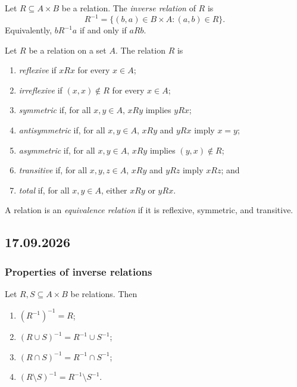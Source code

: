 \documentclass[11pt,a4paper]{amsart}
\begin{document}
\begin{definition}
  Let \(R \subseteq A \times B\) be a relation. The \emph{inverse relation}
  of \(R\) is
  \[
    R^{-1} = \{(b,a) \in B \times A : (a,b) \in R\}.
  \]
  Equivalently, \(bR^{-1}a\) if and only if \(aRb\).
\end{definition}

\begin{definition}
  Let \(R\) be a relation on a set \(A\). The relation \(R\) is
  \begin{enumerate}
    \item \emph{reflexive} if \(xRx\) for every \(x \in A\);
    \item \emph{irreflexive} if \((x,x) \notin R\) for every \(x \in A\);
    \item \emph{symmetric} if, for all \(x,y \in A\),
      \(xRy\) implies \(yRx\);
    \item \emph{antisymmetric} if, for all \(x,y \in A\),
      \(xRy\) and \(yRx\) imply \(x=y\);
    \item \emph{asymmetric} if, for all \(x,y \in A\),
      \(xRy\) implies \((y,x) \notin R\);
    \item \emph{transitive} if, for all \(x,y,z \in A\),
      \(xRy\) and \(yRz\) imply \(xRz\); and
    \item \emph{total} if, for all \(x,y \in A\), either \(xRy\) or
      \(yRx\).
  \end{enumerate}
  A relation is an \emph{equivalence relation} if it is reflexive, symmetric,
  and transitive.
\end{definition}

\subsection{17.09.2026}

\subsubsection{Properties of inverse relations}

\begin{theorem}
  Let \(R,S \subseteq A \times B\) be relations. Then
  \begin{enumerate}[label=(\alph*)]
    \item \((R^{-1})^{-1} = R\);
    \item \((R \cup S)^{-1} = R^{-1} \cup S^{-1}\);
    \item \((R \cap S)^{-1} = R^{-1} \cap S^{-1}\);
    \item \((R \setminus S)^{-1} = R^{-1} \setminus S^{-1}\).
  \end{enumerate}
\end{theorem}
\end{document}
